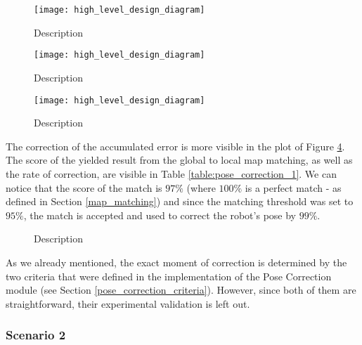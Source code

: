 \begin{figure}
    \centering
    \texttt{[image: high\_level\_design\_diagram]}
    \caption[Name]{
        Description
    }
    \label{fig:bird_3}
\end{figure}

\begin{figure}
    \centering
    \texttt{[image: high\_level\_design\_diagram]}
    \caption[Name]{
        Description
    }
    \label{fig:global_elevation_map_1}
\end{figure}

\begin{figure}
    \centering
    \texttt{[image: high\_level\_design\_diagram]}
    \caption[Name]{
        Description
    }
    \label{fig:global_gradient_map_1}
\end{figure}


The correction of the accumulated error is more visible in the plot of
Figure \ref{fig:pose_correction_error_1}.
The score of the yielded result from the global to local map matching,
as well as the rate of correction, are visible in Table
\ref{table:pose_correction_1}.
We can notice that the score of the match is $97\%$ (where $100\%$ is a
perfect match - as defined in Section \ref{map_matching}) and since
the matching threshold was set to $95\%$, the match is accepted and used
to correct the robot's pose by $99\%$.

\begin{figure}
    \centering
    
    \caption[Name]{
        Description
    }
    \label{fig:pose_correction_error_1}
\end{figure}

As we already mentioned, the exact moment of correction is determined by
the two criteria that were defined in the implementation of the Pose Correction
module (see Section \ref{pose_correction_criteria}).
However, since both of them are straightforward, their experimental
validation is left out.

\subsubsection{Scenario 2}

